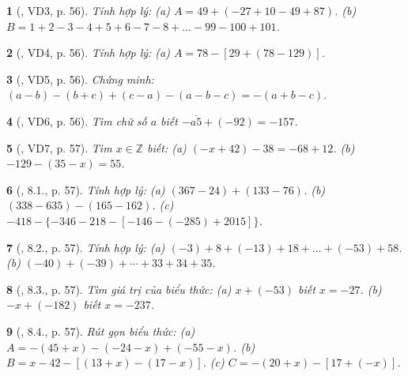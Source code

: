 \documentclass{article}
\newtheorem{baitoan}{}
\begin{document}
\begin{baitoan}[\cite{Binh_boi_duong_Toan_6_tap_1}, VD3, p. 56]
	Tính hợp lý: (a) $A = 49 + (-27 + 10 - 49 + 87)$. (b) $B = 1 + 2 - 3 - 4 + 5 + 6 - 7 - 8 + \ldots - 99 - 100 + 101$.
\end{baitoan}

\begin{baitoan}[\cite{Binh_boi_duong_Toan_6_tap_1}, VD4, p. 56]
	Tính hợp lý: (a) $A = 78 - [29 + (78 - 129)]$.
\end{baitoan}

\begin{baitoan}[\cite{Binh_boi_duong_Toan_6_tap_1}, VD5, p. 56]
	Chứng minh: $(a - b) - (b + c) + (c - a) - (a - b - c) = -(a + b - c)$.
\end{baitoan}

\begin{baitoan}[\cite{Binh_boi_duong_Toan_6_tap_1}, VD6, p. 56]
	Tìm chữ số $a$ biết $-\overline{a5} + (-92) = -157$.
\end{baitoan}

\begin{baitoan}[\cite{Binh_boi_duong_Toan_6_tap_1}, VD7, p. 57]
	Tìm $x\in\mathbb{Z}$ biết: (a) $(-x + 42) - 38 = -68 + 12$. (b) $-129 - (35 - x) = 55$.
\end{baitoan}

\begin{baitoan}[\cite{Binh_boi_duong_Toan_6_tap_1}, 8.1., p. 57]
	Tính hợp lý: (a) $(367 - 24) + (133 - 76)$. (b) $(338 - 635) - (165 - 162)$. (c) $-418 - \{-346 - 218 - [-146 - (-285) + 2015]\}$.
\end{baitoan}

\begin{baitoan}[\cite{Binh_boi_duong_Toan_6_tap_1}, 8.2., p. 57]
	Tính hợp lý: (a) $(-3) + 8 + (-13) + 18 + \ldots + (-53) + 58$. (b) $(-40) + (-39) + \cdots + 33 + 34 + 35$.
\end{baitoan}

\begin{baitoan}[\cite{Binh_boi_duong_Toan_6_tap_1}, 8.3., p. 57]
	Tìm giá trị của biểu thức: (a) $x + (-53)$ biết $x = -27$. (b) $-x + (-182)$ biết $x = -237$.
\end{baitoan}

\begin{baitoan}[\cite{Binh_boi_duong_Toan_6_tap_1}, 8.4., p. 57]
	Rút gọn biểu thức: (a) $A = -(45 + x) - (-24 - x) + (-55 - x)$. (b) $B = x - 42 - [(13 + x) - (17 - x)]$. (c) $C = -(20 + x) - [17 + (-x)]$.
\end{baitoan}
\end{document}
